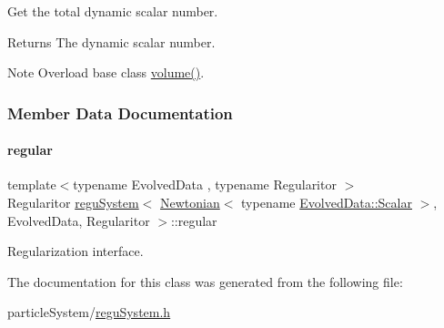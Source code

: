 Get the total dynamic scalar number. 

\begin{DoxyReturn}{Returns}
The dynamic scalar number. 
\end{DoxyReturn}
\begin{DoxyNote}{Note}
Overload base class \mbox{\hyperlink{classregu_system_3_01_newtonian_3_01typename_01_evolved_data_1_1_scalar_01_4_00_01_evolved_data_00_01_regularitor_01_4_a6aa04cb165b83702f851a1697936fa23}{volume()}}. 
\end{DoxyNote}


\subsubsection{Member Data Documentation}
\mbox{\label{classregu_system_3_01_newtonian_3_01typename_01_evolved_data_1_1_scalar_01_4_00_01_evolved_data_00_01_regularitor_01_4_a56f2b9c617d94ca6e1d5ae5cc97fef0f}} 
\paragraph{\texorpdfstring{regular}{regular}}
{\footnotesize\ttfamily template$<$typename Evolved\+Data , typename Regularitor $>$ \\
Regularitor \mbox{\hyperlink{classregu_system}{regu\+System}}$<$ \mbox{\hyperlink{class_newtonian}{Newtonian}}$<$ typename \mbox{\hyperlink{classregu_system_aca8ee2c387943164ee3ea68370fc3ac0}{Evolved\+Data\+::\+Scalar}} $>$, Evolved\+Data, Regularitor $>$\+::regular\hspace{0.3cm}{\ttfamily [private]}}



Regularization interface. 



The documentation for this class was generated from the following file\+:\begin{DoxyCompactItemize}
\item 
particle\+System/\mbox{\hyperlink{regu_system_8h}{regu\+System.\+h}}\end{DoxyCompactItemize}
